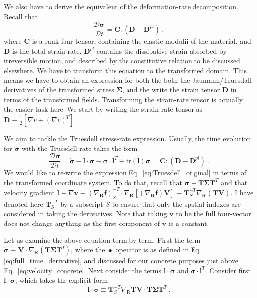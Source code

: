 \documentclass[12pt,a4paper]{article}
\begin{document}
We also have to derive the equivalent of the deformation-rate decomposition. Recall that
\begin{equation}\label{eq:stress_rate}
  \frac{\mathcal{D} \bm{\sigma}}{\mathcal{D} t} = \bm{C}:\left(\bm{D}-\bm{D}^{pl}\right) \ ,
\end{equation}
where $\bm{C}$ is a rank-four tensor, containing the elastic modulii of the material, and $\bm{D}$ is the total strain-rate. $\bm{D}^{pl}$ contains the dissipative strain absorbed by irreversible motion, and described by the constitutive relation to be discussed elsewhere. We have to transform this equation to the transformed domain. This means we have to obtain an expression for both the both the Jaumann/Truesdall derivatives of the transformed stress $\bm{\Sigma}$, and the write the strain tensor $\bm{D}$ in terms of the transformed fields. Transforming the strain-rate tensor is actually the easier task here. We start by writing the strain-rate tensor as $\bm{D}\equiv\frac{1}{2}\left[\nabla v + \left(\nabla v\right)^{T}\right]$.

We aim to tackle the Truesdell stress-rate expression. Usually, the time evolution for $\bm{\sigma}$ with the Truesdell rate takes the form
\begin{equation}\label{eq:Truesdell_original}
   \frac{\mathcal{D} \bm{\sigma}}{\mathcal{D} t} = \dot{\bm{\sigma}} - \bm{l}\cdot\bm{\sigma}-\bm{\sigma}\cdot\bm{l}^{T} + \text{tr}\left(\bm{l}\right)\bm{\sigma} = \bm{C}:\left(\bm{D} - \bm{D}^{pl}\right)\ .
\end{equation}
We would like to re-write the expression Eq.~\eqref{eq:Truesdell_original} in terms of the transformed coordinate system. To do that, recall that $\bm{\sigma}\equiv \bm{T}\bm{\Sigma}\bm{T}^{T}$ and that velocity gradient $\bm{l}\equiv\nabla \bm{v}\equiv \left(\nabla_{\bm{R}} \bm{f}\right)^{-T}_S\cdot \nabla_{\bm{R}} \left[\left( \nabla_{\bm{R}} \bm{f} \right) \bm{V}\right]\equiv \bm{T}^{-T}_S \nabla_{\bm{R}}\left(\bm{T V}\right)$. I have denoted here $\bm{T}^{-T}_S$ by a subscript $S$ to ensure that only the spatial indexes are considered in taking the derivatives. Note that taking $\bm{v}$ to be the full four-vector does not change anything as the first component of $\bm{v}$ is a constant.

Let us examine the above equation term by term. First the term $\dot{\bm{\sigma}}\equiv\bm{V}\cdot\nabla_{\bm{R}}\left({\bm{T}\bm{\Sigma}\bm{T}^{T}}\right)$, where the $\dot{\bullet}$ operator is as defined in Eq.\eqref{eq:full_time_derivative}, and discussed for our concrete purposes just above Eq.~\eqref{eq:velocity_concrete}. Next consider the terms $\bm{l}\cdot\bm{\sigma}$ and $\bm{\sigma}\cdot\bm{l}^{T}$. Consider first $\bm{l}\cdot\bm{\sigma}$, which takes the explicit form
\begin{equation}\label{eq:l_dot_sigma}
  \bm{l}\cdot\bm{\sigma}\equiv \bm{T}^{-T}_S \nabla_{\bm{R}} \bm{T V} \cdot \bm{T}\bm{\Sigma}\bm{T}^{T} \ .
\end{equation}
\end{document}
